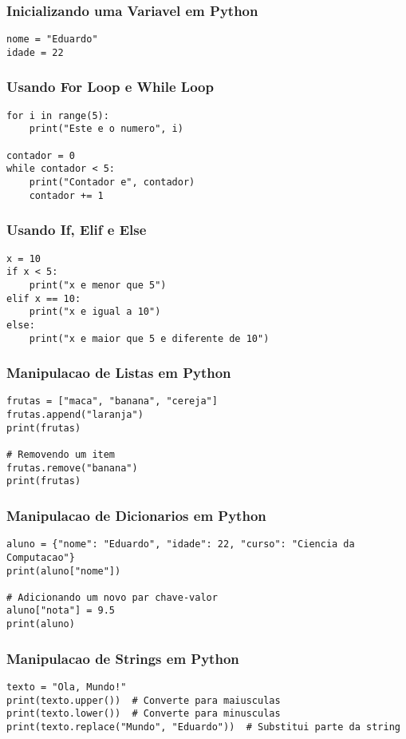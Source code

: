 \documentclass{beamer}
\begin{document}
\begin{frame}[fragile]
  \frametitle{Inicializando uma Variavel em Python}
  \tiny
\begin{lstlisting}
nome = "Eduardo"
idade = 22
\end{lstlisting}
\end{frame}

\begin{frame}[fragile]
  \frametitle{Usando For Loop e While Loop}
  \tiny
\begin{lstlisting}
for i in range(5):
    print("Este e o numero", i)

contador = 0
while contador < 5:
    print("Contador e", contador)
    contador += 1
\end{lstlisting}
\end{frame}

\begin{frame}[fragile]
  \frametitle{Usando If, Elif e Else}
  \tiny
\begin{lstlisting}
x = 10
if x < 5:
    print("x e menor que 5")
elif x == 10:
    print("x e igual a 10")
else:
    print("x e maior que 5 e diferente de 10")
\end{lstlisting}
\end{frame}

\begin{frame}[fragile]
  \frametitle{Manipulacao de Listas em Python}
  \tiny
\begin{lstlisting}
frutas = ["maca", "banana", "cereja"]
frutas.append("laranja")
print(frutas)

# Removendo um item
frutas.remove("banana")
print(frutas)
\end{lstlisting}
\end{frame}

\begin{frame}[fragile]
  \frametitle{Manipulacao de Dicionarios em Python}
  \tiny
\begin{lstlisting}
aluno = {"nome": "Eduardo", "idade": 22, "curso": "Ciencia da Computacao"}
print(aluno["nome"])

# Adicionando um novo par chave-valor
aluno["nota"] = 9.5
print(aluno)
\end{lstlisting}
\end{frame}

\begin{frame}[fragile]
  \frametitle{Manipulacao de Strings em Python}
  \tiny
\begin{lstlisting}
texto = "Ola, Mundo!"
print(texto.upper())  # Converte para maiusculas
print(texto.lower())  # Converte para minusculas
print(texto.replace("Mundo", "Eduardo"))  # Substitui parte da string
\end{lstlisting}
\end{frame}
\end{document}
